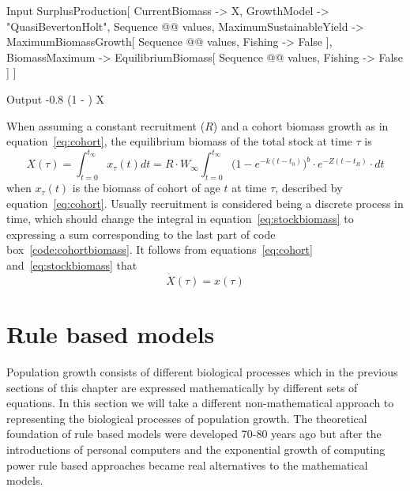\documentclass[11pt,fleqn]{book} %
\begin{document}
\begin{theorem}
\begin{flushleft}
\begin{mmaCell}{Input}
  SurplusProduction[
    CurrentBiomass -> X, 
    GrowthModel    -> "QuasiBevertonHolt", 
    Sequence @@ values, 
    MaximumSustainableYield -> MaximumBiomassGrowth[
      Sequence @@ values, Fishing -> False
    ], 
    BiomassMaximum         -> EquilibriumBiomass[
      Sequence @@ values, Fishing -> False
    ]
  ]
\end{mmaCell}
\begin{mmaCell}{Output}
  -0.8 \bigg(1 - \bigg) X
\end{mmaCell}
\end{flushleft}
\label{code:cohortbiomass}
\end{theorem}

When assuming a constant recruitment ($R$) and a cohort biomass growth as in equation~\ref{eq:cohort}, the equilibrium biomass of the total stock at time $\tau$ is
\begin{equation} 
\label{eq:stockbiomass}
X(\tau) = \int_{t=0}^{t_\infty} x_\tau(t) dt =R  \cdot W_\infty \int_{t=0}^{t_\infty} \big(1 - e^{-k(t-t_0)}\big)^b \cdot e^{-Z(t-t_R)} \cdot dt
\end{equation}
when $x_\tau(t)$ is the biomass of cohort of age $t$ at time $\tau$, described by equation~\ref{eq:cohort}. Usually recruitment is considered being a discrete process in time, which should change the integral in equation~\ref{eq:stockbiomass} to expressing a sum corresponding to the last part of code box~\ref{code:cohortbiomass}. It follows from equations~\ref{eq:cohort} and~\ref{eq:stockbiomass} that
\begin{equation} 
\label{eq:marginalstockbiomass}
\dot{X}(\tau) = x(\tau)
\end{equation}


\section{Rule based models}\label{section:rule based models model}

Population growth consists of different biological processes which in the previous sections of this chapter are expressed mathematically by different sets of equations. In this section we will take a different non-mathematical approach to representing the biological processes of population growth. The theoretical foundation of rule based models were developed 70-80 years ago but after the introductions of personal computers and the exponential growth of computing power rule based approaches became real alternatives to the mathematical models.
\end{document}
